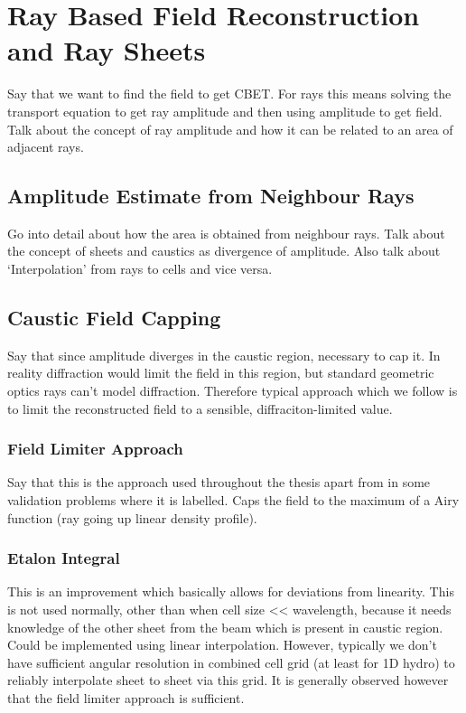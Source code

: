 \section{Ray Based Field Reconstruction and Ray Sheets}
\label{sec:SOLAS_field_reconstruc}

Say that we want to find the field to get CBET.
For rays this means solving the transport equation to get ray amplitude and then using amplitude to get field.
Talk about the concept of ray amplitude and how it can be related to an area of adjacent rays.

\subsection{Amplitude Estimate from Neighbour Rays}
\label{sec:SOLAS_ray_amplitude}

Go into detail about how the area is obtained from neighbour rays.
Talk about the concept of sheets and caustics as divergence of amplitude.
Also talk about `Interpolation' from rays to cells and vice versa.

\subsection{Caustic Field Capping}
Say that since amplitude diverges in the caustic region, necessary to cap it.
In reality diffraction would limit the field in this region, but standard geometric optics rays can't model diffraction.
Therefore typical approach which we follow is to limit the reconstructed field to a sensible, diffraciton-limited value.

\subsubsection{Field Limiter Approach}
Say that this is the approach used throughout the thesis apart from in some validation problems where it is labelled.
Caps the field to the maximum of a Airy function (ray going up linear density profile).

\subsubsection{Etalon Integral}
This is an improvement which basically allows for deviations from linearity.
This is not used normally, other than when cell size << wavelength, because it needs knowledge of the other sheet from the beam which is present in caustic region.
Could be implemented using linear interpolation.
However, typically we don't have sufficient angular resolution in combined cell grid (at least for 1D hydro) to reliably interpolate sheet to sheet via this grid.
It is generally observed however that the field limiter approach is sufficient.

